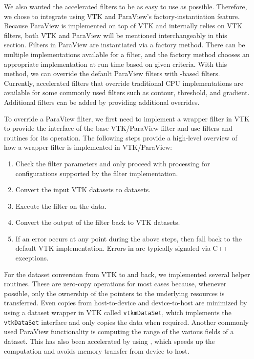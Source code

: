 We also wanted the \vtkm accelerated filters to be as easy to use as possible.
Therefore, we chose to integrate \vtkm using VTK and ParaView's factory-instantiation feature.
Because ParaView is implemented on top of VTK and internally relies on VTK filters, both VTK and ParaView will be mentioned interchangeably in this section.
Filters in ParaView are instantiated via a factory method.
There can be multiple implementations available for a filter, and the factory method chooses an appropriate implementation at run time based on given criteria.
With this method, we can override the default ParaView filters with \vtkm-based filters.
Currently, \vtkm accelerated filters that override traditional CPU implementations are available for some commonly used filters such as contour, threshold, and gradient.
Additional \vtkm filters can be added by providing additional overrides.

To override a ParaView filter, we first need to implement a \vtkm wrapper filter in VTK to provide the interface of the base VTK/ParaView filter and use \vtkm filters and routines for its operation. The following steps provide a high-level overview of how a \vtkm wrapper filter is implemented in VTK/ParaView:
\begin{enumerate}
    \item Check the filter parameters and only proceed with \vtkm processing for configurations supported by the \vtkm filter implementation.
    \item Convert the input VTK datasets to \vtkm datasets. 
    \item Execute the \vtkm filter on the data.
    \item Convert the output of the \vtkm filter back to VTK datasets.
    \item If an error occurs at any point during the above steps, then fall back to the default VTK implementation. Errors in \vtkm are typically signaled via C++ exceptions.
\end{enumerate}

For the dataset conversion from VTK to \vtkm and back, we implemented several helper routines. These are zero-copy operations for most cases because, whenever possible, only the ownership of the pointers to the underlying resources is transferred. Even copies from host-to-device and device-to-host are minimized by using a \vtkm dataset wrapper in VTK called \texttt{vtkmDataSet}, which implements the \texttt{vtkDataSet} interface and only copies the data when required. Another commonly used ParaView functionality is computing the range of the various fields of a dataset. This has also been accelerated by using \vtkm, which speeds up the computation and avoids memory transfer from device to host.

